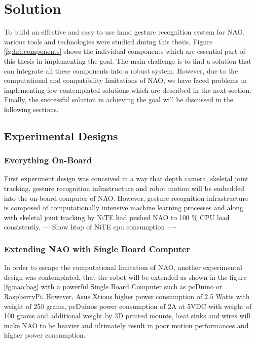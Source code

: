 \chapter{Solution} To build an effective and easy to use hand gesture recognition system for NAO, various tools and technologies were studied during this thesis. Figure \ref{fg:hri:components} shows the individual components which are essential part of this thesis in implementing the goal. The main challenge is to find a solution that can integrate all these components into a robust system. However, due to the computational and compatibility limitations of NAO, we have faced problems in implementing few contemplated solutions which are described in the next section. Finally, the successful solution in achieving the goal will be discussed in the following sections.



\section{Experimental Designs} 
\subsection{Everything On-Board} First experiment design was conceived in a way that depth camera, skeletal joint tracking, gesture recognition infrastructure and robot motion will be embedded into the on-board computer of NAO. However, gesture recognition infrastructure is composed of computationally intensive machine learning processes and along with skeletal joint tracking by NiTE had pushed NAO to 100 $ \% $ CPU load consistently. --- Show htop of NiTE cpu consumption ----

\subsection{Extending NAO with Single Board Computer} In order to escape the computational limitation of NAO, another experimental design was contemplated, that the robot will be extended as shown in the figure \ref{fg:nao:bag} with a powerful Single Board Computer such as pcDuino or RaspberryPi. However, Asus Xtions higher power consumption of 2.5 Watts with weight of 250 grams, pcDuinos power consumption of 2A at 5VDC with weight of 100 grams and additional weight by 3D printed mounts, heat sinks and wires will make NAO to be heavier and ultimately result in poor motion performances and higher power consumption. 


